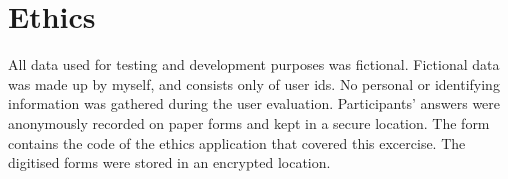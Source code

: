 \chapter{Ethics}
All data used for testing and development purposes was fictional. Fictional data was made up by myself, and consists only of user ids. No personal or identifying information was gathered during the user evaluation. Participants' answers were anonymously recorded on paper forms and kept in a secure location. The form contains the code of the ethics application that covered this excercise. The digitised forms were stored in an encrypted location.